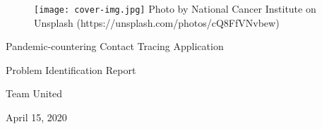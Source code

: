 \thispagestyle{empty}
\vspace*{\fill}
\begin{center}
  \begin{figure}[h]
    \texttt{[image: cover-img.jpg]}
    \centering
    {\footnotesize Photo by National Cancer Institute on Unsplash (https://unsplash.com/photos/cQ8FfVNvbew)}
  \end{figure}

  \vspace{2cm}

  \par {\huge Pandemic-countering Contact Tracing Application}
  \vspace{0.65cm}
  \par {\fontsize{40}{48}\selectfont Problem Identification Report}
  \vspace{0.5cm}
  \par {\LARGE Team United}
  \vspace{0.25cm}
  \par {\large  April 15, 2020}
\end{center}
\vspace*{\fill}

